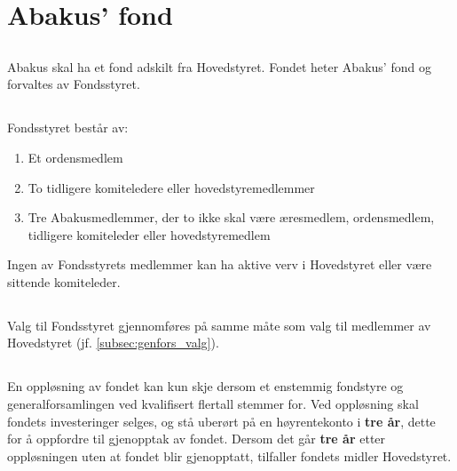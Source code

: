 \section{Abakus' fond}

\subsection{}
Abakus skal ha et fond adskilt fra Hovedstyret. Fondet heter Abakus’ fond og
forvaltes av Fondsstyret.

\subsection{}
Fondsstyret består av:
\begin{enumerate}[label=\alph*)]
    \item Et ordensmedlem
    \item To tidligere komiteledere eller hovedstyremedlemmer
    \item Tre Abakusmedlemmer, der to ikke skal være æresmedlem, ordensmedlem, tidligere komiteleder eller hovedstyremedlem
\end{enumerate}
Ingen av Fondsstyrets medlemmer kan ha aktive verv i Hovedstyret eller være sittende komiteleder. 

\subsection{}
Valg til Fondsstyret gjennomføres på samme måte som valg til medlemmer av Hovedstyret (jf. \ref{subsec:genfors_valg}).

\subsection{}
En oppløsning av fondet kan kun skje dersom et enstemmig fondstyre og generalforsamlingen ved kvalifisert flertall 
stemmer for. Ved oppløsning skal fondets investeringer selges, og stå uberørt på en høyrentekonto i \textbf{tre år}, dette for å
oppfordre til gjenopptak av fondet. Dersom det går \textbf{tre år} etter oppløsningen uten at fondet blir gjenopptatt, 
tilfaller fondets midler Hovedstyret.

